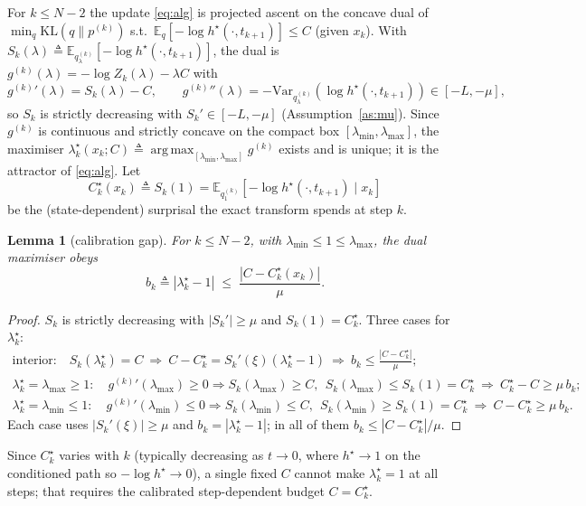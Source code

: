 \documentclass[11pt]{article}
\newcommand{\KL}{\mathrm{KL}}
\newcommand{\E}{\mathbb{E}}
\newcommand{\Var}{\mathrm{Var}}
\newcommand{\hs}{h^\star}
\DeclareMathOperator*{\argmax}{arg\,max}
\newcommand{\lmin}{\lambda_{\min}}
\newcommand{\lmax}{\lambda_{\max}}
\theoremstyle{plain}
\newtheorem{lemma}{Lemma}
\theoremstyle{definition}
\theoremstyle{remark}
\begin{document}
For $k\le N-2$ the update \eqref{eq:alg} is projected ascent on the concave dual of
$\min_q\KL(q\|p^{(k)})$ s.t.\ $\E_q[-\log\hs(\cdot,t_{k+1})]\le C$ (given $x_k$). With
$S_k(\lambda)\triangleq\E_{q^{(k)}_\lambda}[-\log\hs(\cdot,t_{k+1})]$, the dual is
$g^{(k)}(\lambda)=-\log Z_k(\lambda)-\lambda C$ with
\begin{equation}
\label{eq:gder}
g^{(k)}{}'(\lambda)=S_k(\lambda)-C,\qquad
g^{(k)}{}''(\lambda)=-\Var_{q^{(k)}_\lambda}(\log\hs(\cdot,t_{k+1}))\in[-L,-\mu],
\end{equation}
so $S_k$ is strictly decreasing with $S_k'\in[-L,-\mu]$ (Assumption~\ref{as:mu}).
Since $g^{(k)}$ is continuous and strictly concave on the compact box $[\lmin,\lmax]$,
the maximiser $\lambda^\star_k(x_k;C)\triangleq\argmax_{[\lmin,\lmax]}g^{(k)}$ exists
and is unique; it is the attractor of \eqref{eq:alg}. Let
\begin{equation}
\label{eq:Cstar}
C^\star_k(x_k)\triangleq S_k(1)=\E_{q^{(k)}_1}[-\log\hs(\cdot,t_{k+1})\mid x_k]
\end{equation}
be the (state-dependent) surprisal the exact transform spends at step $k$.

\begin{lemma}[calibration gap]
\label{lem:calib}
For $k\le N-2$, with $\lmin\le1\le\lmax$, the dual maximiser obeys
\[
b_k\triangleq|\lambda^\star_k-1|\;\le\;\frac{|C-C^\star_k(x_k)|}{\mu}.
\]
\end{lemma}
\begin{proof}
$S_k$ is strictly decreasing with $|S_k'|\ge\mu$ and $S_k(1)=C^\star_k$. Three cases for $\lambda^\star_k$:
\begin{gather*}
\text{interior:}\quad S_k(\lambda^\star_k)=C\ \Rightarrow\ C-C^\star_k=S_k'(\xi)(\lambda^\star_k-1)\ \Rightarrow\ b_k\le\tfrac{|C-C^\star_k|}{\mu};\\
\lambda^\star_k=\lmax\ge1:\quad g^{(k)}{}'(\lmax)\ge0\Rightarrow S_k(\lmax)\ge C,\ \ S_k(\lmax)\le S_k(1)=C^\star_k
\ \Rightarrow\ C^\star_k-C\ge\mu\,b_k;\\
\lambda^\star_k=\lmin\le1:\quad g^{(k)}{}'(\lmin)\le0\Rightarrow S_k(\lmin)\le C,\ \ S_k(\lmin)\ge S_k(1)=C^\star_k
\ \Rightarrow\ C-C^\star_k\ge\mu\,b_k.
\end{gather*}
Each case uses $|S_k'(\xi)|\ge\mu$ and $b_k=|\lambda^\star_k-1|$; in all of them $b_k\le|C-C^\star_k|/\mu$.
\end{proof}

Since $C^\star_k$ varies with $k$ (typically decreasing as $t\to0$, where $\hs\to1$ on
the conditioned path so $-\log\hs\to0$), a single fixed $C$ cannot make
$\lambda^\star_k=1$ at all steps; that requires the calibrated step-dependent budget
$C=C^\star_k$.
\end{document}
